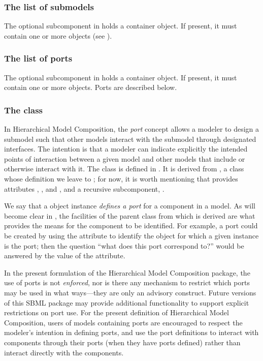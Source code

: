 \subsubsection{The list of submodels}

The optional  subcomponent in \Model holds a \ListOfSubmodels container object.  If present, it must contain one or more \Submodel objects (see ).


\subsubsection{The list of ports}

The optional  subcomponent in \Model holds a \ListOfPorts container object.  If present, it must contain one or more \Port objects.  Ports are described below.


\subsubsection{The  class}
\label{port-class}

In Hierarchical Model Composition, the \emph{port} concept allows a modeler to design a submodel such that other models interact with the submodel through designated interfaces.  The intention is that a modeler can indicate explicitly the intended points of interaction between a given model and other models that include or otherwise interact with it. The \Port class is defined in .  It is derived from \SBaseRef, a class whose definition we leave to ; for now, it is worth mentioning that \SBaseRef provides attributes , ,  and , and a recursive subcomponent, .

We say that a \Port object instance \emph{defines a port} for a component in a model.  As will become clear in , the facilities of the \SBaseRef parent class from which \Port is derived are what provides the means for the component to be identified.  For example, a port could be created by using the  attribute to identify the object for which a given \Port instance is the port; then the question ``what does this port correspond to?'' would be answered by the value of the  attribute.

In the present formulation of the Hierarchical Model Composition package, the use of ports is not \emph{enforced}, nor is there any mechanism to restrict which ports may be used in what ways---they are only an advisory construct.  Future versions of this SBML package may provide additional functionality to support explicit restrictions on port use.  For the present definition of Hierarchical Model Composition, users of models containing ports are encouraged to respect the modeler's intention in defining ports, and use the port definitions to interact with components through their ports (when they have ports defined) rather than interact directly with the components.

